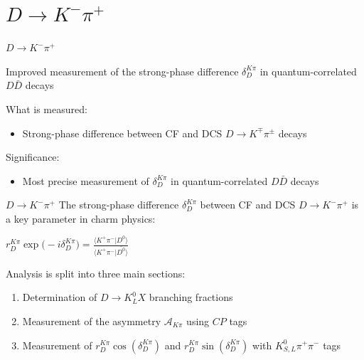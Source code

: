 \documentclass{beamer}
\begin{document}
\section{\texorpdfstring{$D\to K^-\pi^+$}{D2Kpi}}
\begin{frame}{$D\to K^-\pi^+$}
  \begin{tcolorbox}[enhanced,frame style image=blueshade_cropped.png,
    opacityback=0.75,opacitybacktitle=0.25,
    colback=blue!5!white,colframe=blue!75!black,
    title=\color{white}{\href{https://link.springer.com/article/10.1140/epjc/s10052-022-10872-2}{\color{white}{EPJC \textbf{82} 1009 (2022)}}}]
    {\Large Improved measurement of the strong-phase difference $\delta_D^{K\pi}$ in quantum-correlated $D\bar{D}$ decays}
  \end{tcolorbox}
  \vspace{0.7cm}
  What is measured:
  \begin{itemize}
    \item{Strong-phase difference between CF and DCS $D\to K^\mp\pi^\pm$ decays}
  \end{itemize}
  \vspace{0.7cm}
  Significance:
  \begin{itemize}
    \item{Most precise measurement of $\delta_D^{K\pi}$ in quantum-correlated $D\bar{D}$ decays}
  \end{itemize}
\end{frame}

\begin{frame}{$D\to K^-\pi^+$}
  \vspace{0.0cm}
  {\large The strong-phase difference $\delta_D^{K\pi}$ between CF and DCS $D\to K^-\pi^+$ is a key parameter in charm physics:}
  \begin{center}
    $r_D^{K\pi}\exp\big(-i\delta_D^{K\pi}) = \frac{\langle K^+\pi^-\lvert D^0\rangle}{\langle K^+\pi^-\lvert \bar{D^0}\rangle}$
  \end{center}
  \vspace{0.5cm}
  {\large Analysis is split into three main sections:}
  \vspace{0.2cm}
  \begin{enumerate}
    \setlength{\itemsep}{1.0em}
    \item{Determination of $D\to K_L^0X$ branching fractions}
    \item{Measurement of the asymmetry $\mathcal{A}_{K\pi}$ using $C\!P$ tags}
    \item{Measurement of $r_D^{K\pi}\cos(\delta_D^{K\pi})$ and $r_D^{K\pi}\sin(\delta_D^{K\pi})$ with $K_{S, L}^0\pi^+\pi^-$ tags}
  \end{enumerate}
\end{frame}
\end{document}
